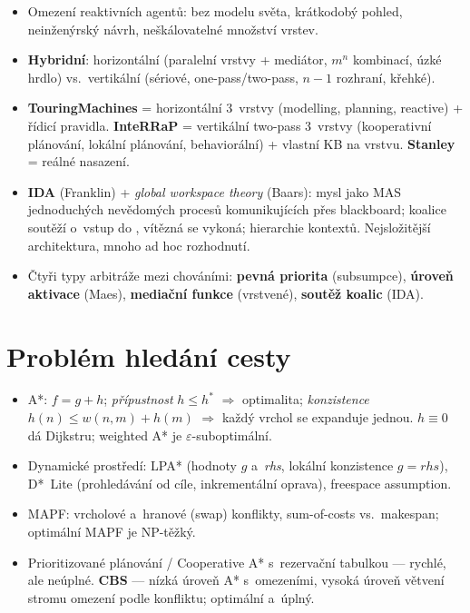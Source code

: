 \documentclass[11pt,a4paper]{article}
\theoremstyle{definition}
\begin{document}
\begin{itemize}
 proaktivitu vs.\ reaktivitu.
\item Omezení reaktivních agentů: bez modelu světa, krátkodobý pohled, neinženýrský návrh,
 neškálovatelné množství vrstev.
\item \textbf{Hybridní}: horizontální (paralelní vrstvy + mediátor, $m^n$ kombinací, úzké hrdlo)
 vs.\ vertikální (sériové, one-pass/two-pass, $n-1$ rozhraní, křehké).
\item \textbf{TouringMachines} = horizontální 3~vrstvy (modelling, planning, reactive) + řídicí
 pravidla. \textbf{InteRRaP} = vertikální two-pass 3~vrstvy (kooperativní plánování, lokální
 plánování, behaviorální) + vlastní KB na vrstvu. \textbf{Stanley} = reálné nasazení.
\item \textbf{IDA} (Franklin) + \emph{global workspace theory} (Baars): mysl jako MAS
 jednoduchých nevědomých procesů komunikujících přes blackboard; koalice soutěží o~vstup do
 , vítězná se vykoná; hierarchie kontextů. Nejsložitější architektura, mnoho
 ad hoc rozhodnutí.
\item Čtyři typy arbitráže mezi chováními: \textbf{pevná priorita} (subsumpce),
 \textbf{úroveň aktivace} (Maes), \textbf{mediační funkce} (vrstvené), \textbf{soutěž koalic}
 (IDA).
\end{itemize}

\section{Problém hledání cesty}
\begin{itemize}
\item A*: $f = g+h$; \emph{přípustnost} $h \le h^*$ $\Rightarrow$ optimalita;
 \emph{konzistence} $h(n) \le w(n,m)+h(m)$ $\Rightarrow$ každý vrchol se expanduje jednou.
 $h\equiv 0$ dá Dijkstru; weighted A* je $\varepsilon$-suboptimální.
\item Dynamické prostředí: LPA* (hodnoty $g$ a~\emph{rhs}, lokální konzistence
 $g=\mathit{rhs}$), D*~Lite (prohledávání od cíle, inkrementální oprava), freespace assumption.
\item MAPF: vrcholové a~hranové (swap) konflikty, sum-of-costs vs.\ makespan;
 optimální MAPF je NP-těžký.
\item Prioritizované plánování / Cooperative A* s~rezervační tabulkou --- rychlé, ale neúplné.
 \textbf{CBS} --- nízká úroveň A* s~omezeními, vysoká úroveň větvení stromu omezení podle
 konfliktu; optimální a~úplný.
\end{itemize}
\end{document}
